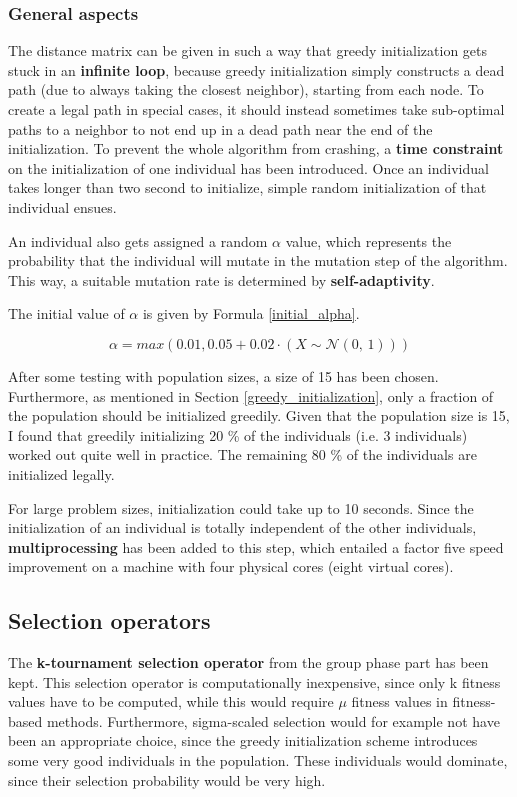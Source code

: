 \documentclass[a4paper,10pt]{article}
\begin{document}
\subsubsection{General aspects}
\label{general_aspects_initialization}
The distance matrix can be given in such a way that greedy initialization gets stuck in an \textbf{infinite loop}, because greedy initialization simply constructs a dead path (due to always taking the closest neighbor), starting from each node. To create a legal path in special cases, it should instead sometimes take sub-optimal paths to a neighbor to not end up in a dead path near the end of the initialization. To prevent the whole algorithm from crashing, a \textbf{time constraint} on the initialization of one individual has been introduced. Once an individual takes longer than two second to initialize, simple random initialization of that individual ensues.

An individual also gets assigned a random $\alpha$ value, which represents the probability that the individual will mutate in the mutation step of the algorithm. This way, a suitable mutation rate is determined by \textbf{self-adaptivity}.

The initial value of $\alpha$ is given by Formula \ref{initial_alpha}.

\begin{equation}
    \label{initial_alpha}
    \alpha = max(0.01, 0.05+0.02 \cdot (X \sim \mathcal{N}(0,\,1)))
\end{equation}

After some testing with population sizes, a size of 15 has been chosen. Furthermore, as mentioned in Section \ref{greedy_initialization}, only a fraction of the population should be initialized greedily. Given that the  population size is 15, I found that greedily initializing 20 \% of the individuals (i.e. 3 individuals) worked out quite well in practice. The remaining 80 \% of the individuals are initialized legally.

For large problem sizes, initialization could take up to 10 seconds. Since the initialization of an individual is totally independent of the other individuals, \textbf{multiprocessing} has been added to this step, which entailed a factor five speed improvement on a machine with four physical cores (eight virtual cores).


\subsection{Selection operators}
\label{selection}
The \textbf{k-tournament selection operator} from the group phase part has been kept. This selection operator is computationally inexpensive, since only k fitness values have to be computed, while this would require $\mu$ fitness values in fitness-based methods. Furthermore, sigma-scaled selection would for example not have been an appropriate choice, since the greedy initialization scheme introduces some very good individuals in the population. These individuals would dominate, since their selection probability would be very high.
\end{document}
